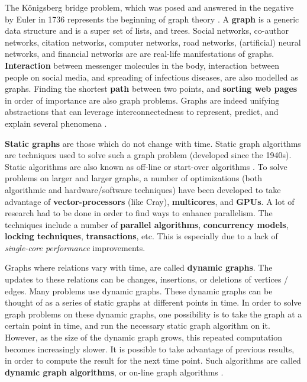 The Königsberg bridge problem, which was posed and answered in the negative by Euler in 1736 represents the beginning of graph theory \cite{graph-weisstein}. A \textbf{graph} is a generic data structure and is a super set of lists, and trees. Social networks, co-author networks, citation networks, computer networks, road networks, (artificial) neural networks, and financial networks are are real-life manifestations of graphs. \textbf{Interaction} between messenger molecules in the body, interaction between people on social media, and spreading of infectious diseases, are also modelled as graphs. Finding the shortest \textbf{path} between two points, and \textbf{sorting web pages} in order of importance are also graph problems. Graphs are indeed unifying abstractions that can leverage interconnectedness to represent, predict, and explain several phenomena \cite{graph-sakr21}.

\textbf{Static graphs} are those which do not change with time. Static graph algorithms are techniques used to solve such a graph problem (developed since the 1940s). Static algorithms are also known as off-line or start-over algorithms \cite{incr-ramalingam96}. To solve problems on larger and larger graphs, a number of optimizations (both algorithmic and hardware/software techniques) have been developed to take advantage of \textbf{vector-processors} (like Cray), \textbf{multicores}, and \textbf{GPUs}. A lot of research had to be done in order to find ways to enhance parallelism. The techniques include a number of \textbf{parallel algorithms}, \textbf{concurrency models}, \textbf{locking techniques}, \textbf{transactions}, etc. This is especially due to a lack of \emph{single-core performance} improvements.

Graphs where relations vary with time, are called \textbf{dynamic graphs}. The updates to these relations can be changes, insertions, or deletions of vertices / edges. Many problems use dynamic graphs. These dynamic graphs can be thought of as a series of static graphs at different points in time. In order to solve graph problems on these dynamic graphs, one possibility is to take the graph at a certain point in time, and run the necessary static graph algorithm on it. However, as the size of the dynamic graph grows, this repeated computation becomes increasingly slower. It is possible to take advantage of previous results, in order to compute the result for the next time point. Such algorithms are called \textbf{dynamic graph algorithms}, or on-line graph algorithms \cite{incr-ramalingam96}.

